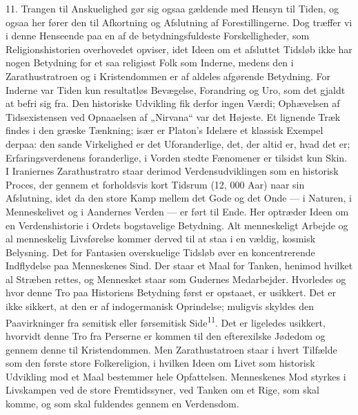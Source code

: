 \documentclass[12pt,a4paper,openany]{book}
\newcommand{\opage}[1]{\marginnote{\footnotesize\textit{[#1]}}}
\begin{document}
11. Trangen til Anskuelighed gør sig ogsaa gældende med Hensyn til
Tiden, og ogsaa her fører den til Afkortning og Afslutning af
Forestillingerne. Dog træffer vi i denne Henseende paa en af de
betydningsfuldeste Forskelligheder, som Religionshistorien overhovedet
opviser, idet Ideen om et afsluttet Tidsløb ikke
\opage{31}har nogen Betydning for et saa religiøst Folk som Inderne,
medens den i Zarathustratroen og i Kristendommen er af aldeles afgørende
Betydning. For Inderne var Tiden kun resultatløs Bevægelse, Forandring
og Uro, som det gjaldt at befri sig fra. Den historiske Udvikling fik
derfor ingen Værdi; Ophævelsen af Tidsexistensen ved Opnaaelsen af
„Nirvana“ var det Højeste. Et lignende Træk findes i den græske
Tænkning; især er Platon’s Idelære et klassisk Exempel derpaa: den sande
Virkelighed er det Uforanderlige, det, der altid er, hvad det er;
Erfaringsverdenens foranderlige, i Vorden stedte Fænomener er tilsidst
kun Skin. I Iraniernes Zarathustratro staar derimod Verdensudviklingen
som en historisk Proces, der gennem et forholdsvis kort Tidsrum (12, 000
Aar) naar sin Afslutning, idet da den store Kamp mellem det Gode og det
Onde --- i Naturen, i Menneskelivet og i Aandernes Verden --- er ført
til Ende. Her optræder Ideen om en Verdenshistorie i Ordets bogstavelige
Betydning. Alt menneskeligt Arbejde og al menneskelig Livsførelse kommer
derved til at staa i en vældig, kosmisk Belysning. Det for Fantasien
overskuelige Tidsløb øver en koncentrerende Indflydelse paa Menneskenes
Sind. Der staar et Maal for Tanken, henimod hvilket al Stræben rettes,
og Mennesket staar som Gudernes Medarbejder. Hvorledes og hvor denne Tro
paa Historiens Betydning først er opstaaet, er usikkert. Det er ikke
sikkert, at den er af indogermanisk Oprindelse; muligvis skyldes den
Paavirkninger fra semitisk eller førsemitisk Side\textsuperscript{11}.
Det er ligeledes usikkert, hvorvidt denne Tro fra Perserne er kommen til
den efterexilske Jødedom og gennem denne til Kristendommen. Men
Zarathustatroen staar i hvert Tilfælde som den første store
Folkereligion, i hvilken Ideen om Livet som historisk Udvikling mod et
Maal bestemmer hele Opfattelsen. Menneskenes Mod styrkes i Livskampen
ved de store Fremtidssyner, ved Tanken om et Rige, som skal komme, og
som skal fuldendes gennem en Verdensdom.
\end{document}
